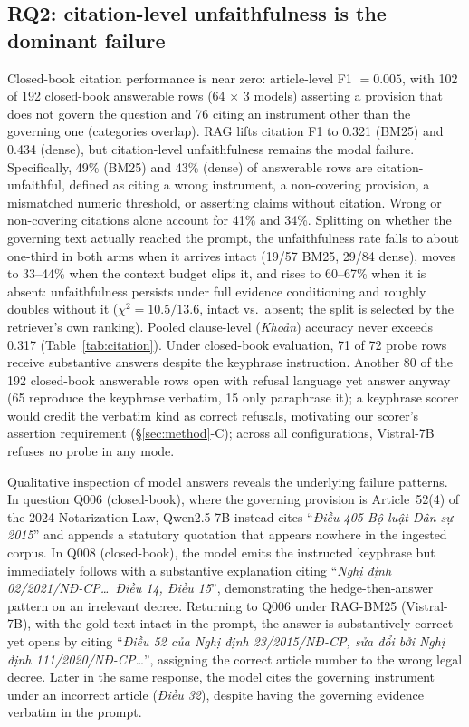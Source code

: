 \documentclass[conference,a4paper]{IEEEtran}
\begin{document}
\subsection{RQ2: citation-level unfaithfulness is the dominant failure}
Closed-book citation performance is near zero: article-level F1 $= 0.005$, with 102 of 192 closed-book answerable rows (64 $\times$ 3 models) asserting a provision that does not govern the question and 76 citing an instrument other than the governing one (categories overlap). RAG lifts citation F1 to 0.321 (BM25) and 0.434 (dense), but citation-level unfaithfulness remains the modal failure. Specifically, 49\% (BM25) and 43\% (dense) of answerable rows are citation-unfaithful, defined as citing a wrong instrument, a non-covering provision, a mismatched numeric threshold, or asserting claims without citation. Wrong or non-covering citations alone account for 41\% and 34\%. Splitting on whether the governing text actually reached the prompt, the unfaithfulness rate falls to about one-third in both arms when it arrives intact (19/57 BM25, 29/84 dense), moves to 33--44\% when the context budget clips it, and rises to 60--67\% when it is absent: unfaithfulness persists under full evidence conditioning and roughly doubles without it ($\chi^2{=}10.5/13.6$, intact vs.\ absent; the split is selected by the retriever's own ranking). Pooled clause-level (\emph{Khoản}) accuracy never exceeds 0.317 (Table~\ref{tab:citation}). Under closed-book evaluation, 71 of 72 probe rows receive substantive answers despite the keyphrase instruction. Another 80 of the 192 closed-book answerable rows open with refusal language yet answer anyway (65 reproduce the keyphrase verbatim, 15 only paraphrase it); a keyphrase scorer would credit the verbatim kind as correct refusals, motivating our scorer's assertion requirement (\S\ref{sec:method}-C); across all configurations, Vistral-7B refuses no probe in any mode.

Qualitative inspection of model answers reveals the underlying failure patterns. In question Q006 (closed-book), where the governing provision is Article~52(4) of the 2024 Notarization Law, Qwen2.5-7B instead cites ``\emph{Điều 405 Bộ luật Dân sự 2015}'' and appends a statutory quotation that appears nowhere in the ingested corpus. In Q008 (closed-book), the model emits the instructed keyphrase but immediately follows with a substantive explanation citing ``\emph{Nghị định 02/2021/NĐ-CP\ldots\ Điều 14, Điều 15}'', demonstrating the hedge-then-answer pattern on an irrelevant decree. Returning to Q006 under RAG-BM25 (Vistral-7B), with the gold text intact in the prompt, the answer is substantively correct yet opens by citing ``\emph{Điều 52 của Nghị định 23/2015/NĐ-CP, sửa đổi bởi Nghị định 111/2020/NĐ-CP\ldots}'', assigning the correct article number to the wrong legal decree. Later in the same response, the model cites the governing instrument under an incorrect article (\emph{Điều 32}), despite having the governing evidence verbatim in the prompt.
\end{document}
